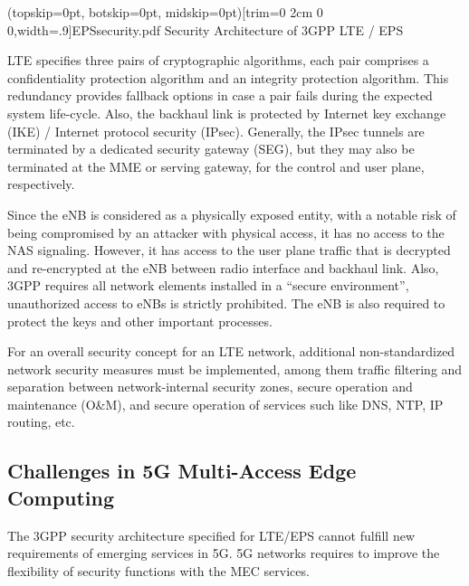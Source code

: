 \documentclass{ieeeaccess}
\newcommand{\change}[1]{#1}
\begin{document}
	\Figure[htbp!](topskip=0pt, botskip=0pt, midskip=0pt)[trim={0 2cm 0 0},width=.9\textwidth]{EPSsecurity.pdf}
	{Security Architecture of 3GPP LTE / EPS\cite{5gn2017network}\label{fig:LTE-sec}}
	
	LTE specifies three pairs of \change{cryptographic} algorithms, each pair comprises a confidentiality protection algorithm and an integrity protection algorithm. \change{This redundancy provides fallback options in case a pair} fails during the expected system life-cycle. Also, the backhaul link is protected by Internet key exchange (IKE) / Internet protocol security (IPsec). Generally, the IPsec tunnels are terminated by a dedicated security gateway (SEG), but they may also be terminated at the MME or serving gateway, for the control and user plane, respectively. 
	
	\change{Since the} eNB is considered as a physically exposed entity, with a notable risk of being compromised by an attacker with physical access, \change{it has no access to the NAS signaling.} However, it has access to the user plane traffic that is decrypted and re-encrypted at the eNB between radio interface and backhaul link. \change{Also, 3GPP requires all network elements installed in a ``secure environment'', unauthorized access to eNBs is strictly prohibited. The eNB is also required to protect the keys and other important processes. }
	
	For an overall security concept for an LTE network, additional non-standardized network security measures must be implemented, \change{among them traffic filtering and separation between network-internal security zones, secure operation and maintenance (O\&M), and secure operation of services such like DNS, NTP, IP routing, etc.}
	
	\subsection{Challenges in 5G Multi-Access Edge Computing}\label{subsec:challenges}
	The 3GPP security architecture specified for LTE/EPS cannot fulfill new requirements of emerging services in 5G. 5G networks requires to improve the flexibility of security functions with the MEC services.
	
\end{document}
